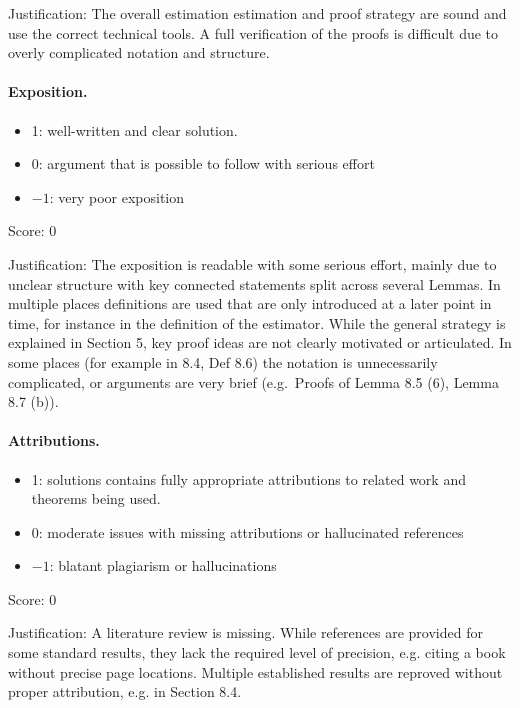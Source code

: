 \documentclass[11pt]{article}
\theoremstyle{definition}
\theoremstyle{remark}
\begin{document}
\noindent Justification: The overall estimation estimation and proof strategy are sound and use the correct technical tools. A full verification of the proofs is difficult due to overly complicated notation and structure.

\paragraph{Exposition.}
\begin{itemize}
	\item  1: well-written and clear solution.
	\item  0: argument that is possible to follow with serious effort
	\item  $-1$: very poor exposition
\end{itemize}

\noindent Score: 0

\noindent Justification: The exposition is readable with some serious effort, mainly due to unclear structure with key connected statements split across several Lemmas. In multiple places definitions are used that are only introduced at a later point in time, for instance in the definition of the estimator. While the general strategy is explained in Section 5, key proof ideas are not clearly motivated or articulated. In some places (for example in 8.4, Def 8.6) the notation is unnecessarily complicated, or arguments are very brief (e.g.\ Proofs of Lemma 8.5 (6), Lemma 8.7 (b)).

\paragraph{Attributions.}
\begin{itemize}
	\item  1: solutions contains fully appropriate attributions
		to related work and theorems being used.
	\item  0: moderate issues with missing attributions or hallucinated references
	\item  $-1$: blatant plagiarism or hallucinations
\end{itemize}

\noindent Score: 0

\noindent Justification: A literature review is missing. While references are provided for some standard results, they lack the required level of precision, e.g. citing a  book without precise page locations. Multiple established results are reproved without proper attribution, e.g. in Section 8.4.
\end{document}
